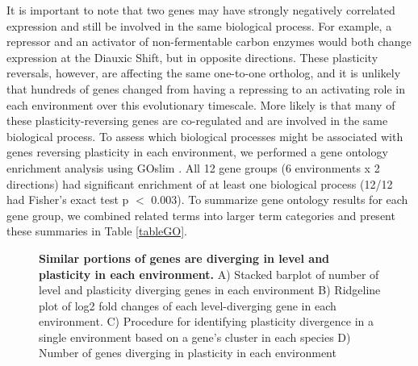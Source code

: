 It is important to note that two genes may have strongly negatively correlated expression and still be involved in the same biological process. For example, a repressor and an activator of non-fermentable carbon enzymes would both change expression at the Diauxic Shift, but in opposite directions. These plasticity reversals, however, are affecting the same one-to-one ortholog, and it is unlikely that hundreds of genes changed from having a repressing to an activating role in each environment over this evolutionary timescale. More likely is that many of these plasticity-reversing genes are co-regulated and are involved in the same biological process. To assess which biological processes might be associated with genes reversing plasticity in each environment, we performed a gene ontology enrichment analysis using GOslim \cite{Skrzypek2011}. All 12 gene groups (6 environments x 2 directions) had significant enrichment of at least one biological process (12/12 had Fisher’s exact test p $<$ 0.003). To summarize gene ontology results for each gene group, we combined related terms into larger term categories and present these summaries in Table \ref{tableGO}.

\begin{figure}
    \centering
    \caption{\textbf{Similar portions of genes are diverging in level and plasticity in each environment.} A) Stacked barplot of number of level and plasticity diverging genes in each environment B) Ridgeline plot of log2 fold changes of each level-diverging gene in each environment. C) Procedure for identifying plasticity divergence in a single environment based on a gene’s cluster in each species D) Number of genes diverging in plasticity in each environment}
    \label{fig:proportions}
\end{figure}

